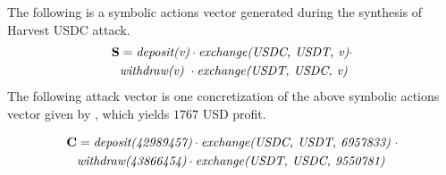 






\begin{example}
The following is a symbolic actions vector generated during the synthesis of Harvest USDC attack.
\vspace{-1mm}
\begin{align*}  
\mathbf{S} & =  \emph{deposit(v)} \cdot \emph{exchange(USDC, USDT, v)} \cdot  \\
 &   \emph{withdraw(v)} \ \cdot \emph{exchange(USDT, USDC, v)}
\end{align*} 
\noindent The following attack vector is one concretization of the above symbolic actions vector given by {\name}, 
which yields $1767$ USD profit.

\vspace{-1mm}
\begin{align*}  
\mathbf{C} & = \emph{deposit(42989457)} \cdot \emph{exchange(USDC, USDT,  6957833)}\ \cdot  \\
&  \emph{withdraw(43866454)} \cdot  \emph{exchange(USDT, USDC, 9550781)}
\end{align*} 

\end{example}


